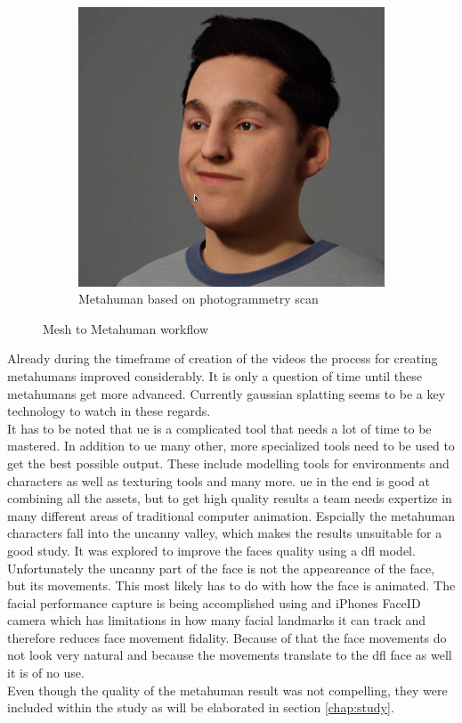 \documentclass[
  a4paper,  %
  twoside,  %
  bibliography=totoc,
  headsepline,
  cleardoublepage=empty,
  parskip=half,
  draft=false
]{scrbook}
\begin{document}
\begin{figure}[h]
\begin{subfigure}[b]{0.5\textwidth}
    \includegraphics[width=\textwidth]{./graphics/images/Metahuman.png}
    \caption{Metahuman based on photogrammetry scan}
    \label{fig:metahuman-result}
  \end{subfigure}
  \caption{Mesh to Metahuman workflow}
  \label{fig:metahuman-comp}
\end{figure}

Already during the timeframe of creation of the videos the process for creating metahumans improved considerably. It is only a question of time until these metahumans get more advanced. Currently gaussian splatting seems to be a key technology to watch in these regards. \\
It has to be noted that \gls{ue} is a complicated tool that needs a lot of time to be mastered. In addition to \gls{ue} many other, more specialized tools need to be used to get the best possible output. These include modelling tools for environments and characters as well as texturing tools and many more. \gls{ue} in the end is good at combining all the assets, but to get high quality results a team needs expertize in many different areas of traditional computer animation. Espcially the metahuman characters fall into the uncanny valley, which makes the results unsuitable for a good study. It was explored to improve the faces quality using a \gls{dfl} model. Unfortunately the uncanny part of the face is not the appeareance of the face, but its movements. This most likely has to do with how the face is animated. The facial performance capture is being accomplished using and iPhones FaceID camera which has limitations in how many facial landmarks it can track and therefore reduces face movement fidality. Because of that the face movements do not look very natural and because the movements translate to the \gls{dfl} face as well it is of no use. \\
Even though the quality of the metahuman result was not compelling, they were included  within the study as will be elaborated in section \ref{chap:study}. 
\end{document}

